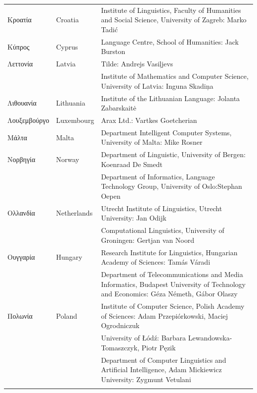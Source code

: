 \documentclass[]{../../metanetpaper}
\begin{document}
\begin{longtable}{@{}llp{113mm}@{}}
  Κροατία & \textcolor{grey1}{Croatia} & Institute of Linguistics, Faculty of Humanities and Social Science, University of Zagreb: Marko Tadić \\ \addlinespace
  Κύπρος & \textcolor{grey1}{Cyprus} & Language Centre, School of Humanities: Jack Burston\\ \addlinespace
  Λεττονία & \textcolor{grey1}{Latvia} & Tilde: Andrejs Vasiļjevs\\ \addlinespace 
  & & Institute of Mathematics and Computer Science, University of Latvia: Inguna Skadiņa\\ \addlinespace
  Λιθουανία & \textcolor{grey1}{Lithuania} & Institute of the Lithuanian Language: Jolanta Zabarskaitė\\ \addlinespace
  Λουξεμβούργο & \textcolor{grey1}{Luxembourg} & Arax Ltd.: Vartkes Goetcherian\\ \addlinespace
  Μάλτα & \textcolor{grey1}{Malta} & Department Intelligent Computer Systems, University of Malta: Mike Rosner\\ \addlinespace
  Νορβηγία & \textcolor{grey1}{Norway} & Department of Linguistic, University of Bergen: Koenraad De Smedt\\ \addlinespace 
  & & Department of Informatics, Language Technology Group, University of Oslo:\newline Stephan Oepen \\ \addlinespace
  Ολλανδία & \textcolor{grey1}{Netherlands} & Utrecht Institute of Linguistics, Utrecht University: Jan Odijk\\ \addlinespace 
  & & Computational Linguistics, University of Groningen: Gertjan van Noord\\ \addlinespace
  Ουγγαρία & \textcolor{grey1}{Hungary} & Research Institute for Linguistics, Hungarian Academy of Sciences: Tamás Váradi\\  \addlinespace
  & & Department of Telecommunications and Media Informatics, Budapest University of Technology and Economics: Géza Németh, Gábor Olaszy\\ \addlinespace
  Πολωνία & \textcolor{grey1}{Poland} & Institute of Computer Science, Polish Academy of Sciences: Adam Przepiórkowski, Maciej Ogrodniczuk \\ \addlinespace
  & & University of Łódź: Barbara Lewandowska-Tomaszczyk, Piotr Pęzik\\ \addlinespace
  & & Department of Computer Linguistics and Artificial Intelligence, Adam Mickiewicz University: Zygmunt Vetulani \\ \addlinespace

\end{longtable}
\end{document}
